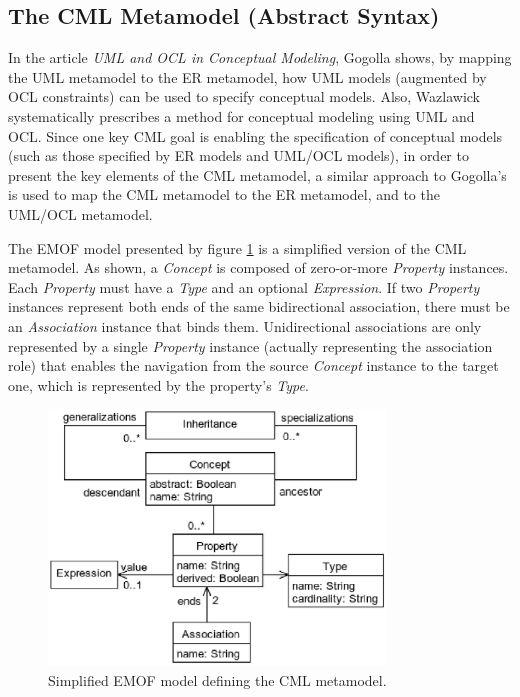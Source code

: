 \subsection{The CML Metamodel (Abstract Syntax)}\label{subsec:metamodel}

In the article \emph{UML and OCL in Conceptual Modeling},
Gogolla \cite{gogolla} shows, by mapping the UML \cite{uml} metamodel to the ER \cite{er} metamodel,
how UML models (augmented by OCL \cite{ocl} constraints) can be used to specify conceptual models.
Also, Wazlawick \cite{wazlawick} systematically prescribes a method for conceptual modeling using UML and OCL.
Since one key CML goal is enabling the specification of conceptual models
(such as those specified by ER models and UML/OCL models),
in order to present the key elements of the CML metamodel,
a similar approach to Gogolla's is used to map the CML metamodel to the ER metamodel,
and to the UML/OCL metamodel.

The EMOF \cite{mof} model presented by figure \ref{fig:metamodel} is a simplified version of the CML metamodel.
As shown, a \emph{Concept} is composed of zero-or-more \emph{Property} instances.
Each \emph{Property} must have a \emph{Type} and an optional \emph{Expression}.
If two \emph{Property} instances represent both ends of the same bidirectional association,
there must be an \emph{Association} instance that binds them.
Unidirectional associations are only represented by a single \emph{Property} instance
(actually representing the association role)
that enables the navigation from the source \emph{Concept} instance to the target one,
which is represented by the property's \emph{Type}.

\begin{figure}
\centering
\includegraphics[width=0.8\textwidth]{language/diagram-metamodel}
\caption{Simplified EMOF \cite{mof} model defining the CML metamodel.}
\label{fig:metamodel}
\end{figure}

